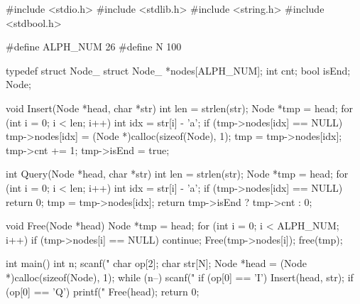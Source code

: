 \begin{mycpptwocol}[链表形式的Trie]
    #include <stdio.h>
    #include <stdlib.h>
    #include <string.h>
    #include <stdbool.h>

    #define ALPH_NUM 26
    #define N 100

    typedef struct Node_ {
        struct Node_ *nodes[ALPH_NUM];
        int cnt;
        bool isEnd;
    } Node;

    void Insert(Node *head, char *str)
        {
        int len = strlen(str);
        Node *tmp = head;
        for (int i = 0; i < len; i++) {
            int idx = str[i] - 'a';
            if (tmp->nodes[idx] == NULL) {
                tmp->nodes[idx] = (Node *)calloc(sizeof(Node), 1);
            }
            tmp = tmp->nodes[idx];
        }
        tmp->cnt += 1;
        tmp->isEnd = true;
    }

    int Query(Node *head, char *str)
        {
        int len = strlen(str);
        Node *tmp = head;
        for (int i = 0; i < len; i++) {
            int idx = str[i] - 'a';
            if (tmp->nodes[idx] == NULL) {
                return 0;
            }
            tmp = tmp->nodes[idx];
        }
        return tmp->isEnd ? tmp->cnt : 0;
    }

    void Free(Node *head) {
        Node *tmp = head;
        for (int i = 0; i < ALPH_NUM; i++) {
            if (tmp->nodes[i] == NULL) {
                continue;
            }
            Free(tmp->nodes[i]);
        }
        free(tmp);
    }

    int main()
        {
        int n;
        scanf("%
        char op[2];
        char str[N];
        Node *head = (Node *)calloc(sizeof(Node), 1);
        while (n--) {
            scanf("%
            if (op[0] == 'I') {
                Insert(head, str);
            }
            if (op[0] == 'Q') {
                printf("%
            }
        }
        Free(head);
        return 0;
    }
\end{mycpptwocol}

